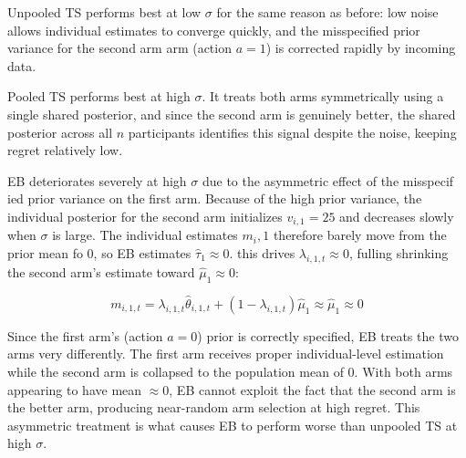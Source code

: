 \documentclass[letterpaper, 9pt]{extarticle}
\begin{document}
Unpooled TS performs best at low $\sigma$ for the same reason as before: low noise allows individual estimates to converge quickly, and the misspecified prior variance for the second arm arm (action $a = 1$) is corrected rapidly by incoming data.

Pooled TS performs best at high $\sigma$. It treats both arms symmetrically using a single shared posterior, and since the second arm is genuinely better, the shared posterior across all $n$ participants identifies this signal despite the noise, keeping regret relatively low.

EB deteriorates severely at high $\sigma$ due to the asymmetric effect of the misspecif
ied prior variance on the first arm. Because of the high prior variance, the individual posterior for the second arm initializes $v_{i,1} = 25$ and decreases slowly when $\sigma$ is large. The individual estimates $m_i,1$ therefore barely move from the prior mean fo $0$, so EB estimates $\hat{\tau}_1 \approx 0$. this drives $\lambda_{i,1,t} \approx 0$, fulling shrinking the second arm's estimate toward $\hat{\mu}_1 \approx 0$:

$$m_{i,1,t} = \lambda_{i,1,t} \hat{\theta}_{i,1,t} + (1-\lambda_{i,1,t}) \hat{\mu}_1 \approx \hat{\mu}_1 \approx 0$$

Since the first arm's (action $a=0$) prior is correctly specified, EB treats the two arms very differently. The first arm receives proper individual-level estimation while the second arm is collapsed to the population mean of $0$. With both arms appearing to have mean $\approx 0$, EB cannot exploit the fact that the second arm is the better arm, producing near-random arm selection at high regret. This asymmetric treatment is what causes EB to perform worse than unpooled TS at high $\sigma$.

\end{document}
